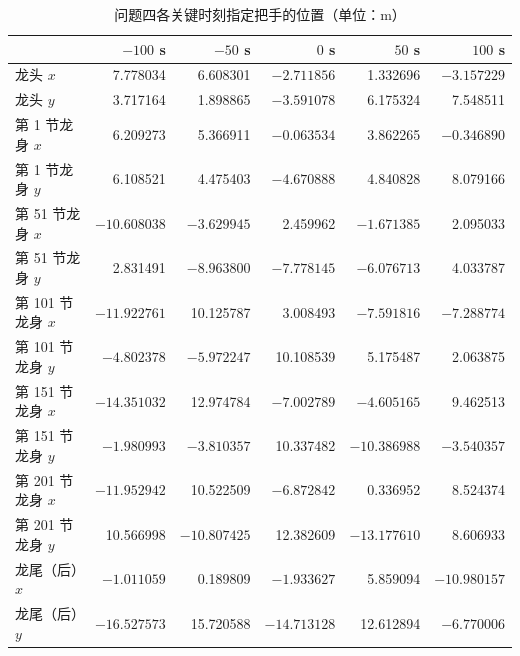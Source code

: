 ﻿\documentclass{cumcmthesis}
\begin{document}
\begin{table}[H]
\centering
\caption{问题四各关键时刻指定把手的位置（单位：m）}
\label{tab:q4pos}
\footnotesize\setlength{\tabcolsep}{3.6pt}
\renewcommand{\arraystretch}{1.15}
\begin{tabular}{lrrrrr}
\toprule
 & $-100$ s & $-50$ s & $0$ s & $50$ s & $100$ s \\
\midrule
龙头 $x$ & 7.778034 & 6.608301 & $-2.711856$ & 1.332696 & $-3.157229$ \\
龙头 $y$ & 3.717164 & 1.898865 & $-3.591078$ & 6.175324 & 7.548511 \\
第 1 节龙身 $x$ & 6.209273 & 5.366911 & $-0.063534$ & 3.862265 & $-0.346890$ \\
第 1 节龙身 $y$ & 6.108521 & 4.475403 & $-4.670888$ & 4.840828 & 8.079166 \\
第 51 节龙身 $x$ & $-10.608038$ & $-3.629945$ & 2.459962 & $-1.671385$ & 2.095033 \\
第 51 节龙身 $y$ & 2.831491 & $-8.963800$ & $-7.778145$ & $-6.076713$ & 4.033787 \\
第 101 节龙身 $x$ & $-11.922761$ & 10.125787 & 3.008493 & $-7.591816$ & $-7.288774$ \\
第 101 节龙身 $y$ & $-4.802378$ & $-5.972247$ & 10.108539 & 5.175487 & 2.063875 \\
第 151 节龙身 $x$ & $-14.351032$ & 12.974784 & $-7.002789$ & $-4.605165$ & 9.462513 \\
第 151 节龙身 $y$ & $-1.980993$ & $-3.810357$ & 10.337482 & $-10.386988$ & $-3.540357$ \\
第 201 节龙身 $x$ & $-11.952942$ & 10.522509 & $-6.872842$ & 0.336952 & 8.524374 \\
第 201 节龙身 $y$ & 10.566998 & $-10.807425$ & 12.382609 & $-13.177610$ & 8.606933 \\
龙尾（后）$x$ & $-1.011059$ & 0.189809 & $-1.933627$ & 5.859094 & $-10.980157$ \\
龙尾（后）$y$ & $-16.527573$ & 15.720588 & $-14.713128$ & 12.612894 & $-6.770006$ \\
\bottomrule
\end{tabular}
\end{table}
\end{document}
